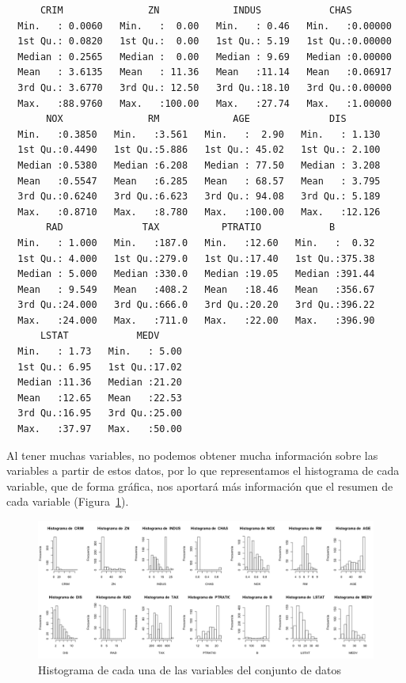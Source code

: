 \documentclass[12pt,a4paper,twoside,openright,titlepage,final]{article}
\begin{document}
\begin{verbatim}
      CRIM               ZN             INDUS            CHAS        
  Min.   : 0.0060   Min.   :  0.00   Min.   : 0.46   Min.   :0.00000  
  1st Qu.: 0.0820   1st Qu.:  0.00   1st Qu.: 5.19   1st Qu.:0.00000  
  Median : 0.2565   Median :  0.00   Median : 9.69   Median :0.00000  
  Mean   : 3.6135   Mean   : 11.36   Mean   :11.14   Mean   :0.06917  
  3rd Qu.: 3.6770   3rd Qu.: 12.50   3rd Qu.:18.10   3rd Qu.:0.00000  
  Max.   :88.9760   Max.   :100.00   Max.   :27.74   Max.   :1.00000  
       NOX               RM             AGE              DIS        
  Min.   :0.3850   Min.   :3.561   Min.   :  2.90   Min.   : 1.130  
  1st Qu.:0.4490   1st Qu.:5.886   1st Qu.: 45.02   1st Qu.: 2.100  
  Median :0.5380   Median :6.208   Median : 77.50   Median : 3.208  
  Mean   :0.5547   Mean   :6.285   Mean   : 68.57   Mean   : 3.795  
  3rd Qu.:0.6240   3rd Qu.:6.623   3rd Qu.: 94.08   3rd Qu.: 5.189  
  Max.   :0.8710   Max.   :8.780   Max.   :100.00   Max.   :12.126  
       RAD              TAX           PTRATIO            B         
  Min.   : 1.000   Min.   :187.0   Min.   :12.60   Min.   :  0.32  
  1st Qu.: 4.000   1st Qu.:279.0   1st Qu.:17.40   1st Qu.:375.38  
  Median : 5.000   Median :330.0   Median :19.05   Median :391.44  
  Mean   : 9.549   Mean   :408.2   Mean   :18.46   Mean   :356.67  
  3rd Qu.:24.000   3rd Qu.:666.0   3rd Qu.:20.20   3rd Qu.:396.22  
  Max.   :24.000   Max.   :711.0   Max.   :22.00   Max.   :396.90  
      LSTAT            MEDV      
  Min.   : 1.73   Min.   : 5.00  
  1st Qu.: 6.95   1st Qu.:17.02  
  Median :11.36   Median :21.20  
  Mean   :12.65   Mean   :22.53  
  3rd Qu.:16.95   3rd Qu.:25.00  
  Max.   :37.97   Max.   :50.00  
\end{verbatim}

Al tener muchas variables, no podemos obtener mucha información sobre las variables a partir de estos datos, por lo que representamos el histograma de cada variable, que de forma gráfica, nos aportará más información que el resumen de cada variable (Figura~\ref{fig:histogramas}).\\


\begin{figure}[tbph!]
\centering
\includegraphics[width=0.9\linewidth]{imagenes/histogramas}
\caption{Histograma de cada una de las variables del conjunto de datos}
\label{fig:histogramas}
\end{figure}
\end{document}
